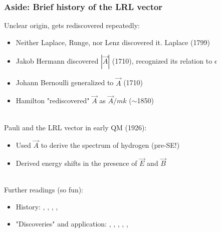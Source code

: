 \documentclass{beamer}
\theoremstyle{definition}
\begin{document}
\begin{frame}
\frametitle{Aside: Brief history of the LRL vector}


\pause

Unclear origin, gets rediscovered repeatedly:\pause
\begin{itemize}
	\item Neither Laplace, Runge, nor Lenz discovered it. Laplace (1799) \pause
	\item Jakob Hermann discovered $|\vec{A}|$ (1710), recognized its relation to $\epsilon$ \pause
	\item  Johann Bernoulli generalized to $\vec{A}$ (1710) \pause
	\item Hamilton "rediscovered" $\vec{A}$ as $\vec{A}/m k$ ($\sim$1850) \pause
\end{itemize}
\,\,\, \\ 
Pauli and the LRL vector in early QM (1926): \pause
\begin{itemize}
	\item Used $\vec{A}$ to derive the spectrum of hydrogen (pre-SE!) \pause
	
	\item Derived energy shifts in the presence of $\vec{E}$ and $\vec{B}$ \pause
\end{itemize}

\pause

\,\,\, \\
Further readings (so fun):  

\begin{itemize}
\item History: \cite{valent2003hydrogen}, 
\cite{stahlhofen2004pauli},
\cite{goldstein1975prehistory},
\cite{goldstein1976more},
\cite{goldstein2002classical}


\item "Discoveries"  and application: 
\cite{runge1919vektoranalysis},
\cite{laplace1823traite},
\cite{lenz1924bewegungsverlauf},
\cite{hamilton1847application},
\cite{hermann1710unknown},
\cite{pauli1926wasserstoffspektrum}
\end{itemize}

\end{frame}
\end{document}
